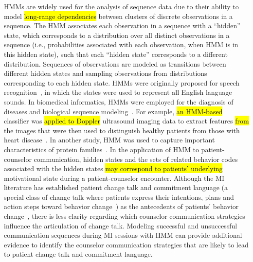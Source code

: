 \documentclass[smallextended]{svjour3}       %
\begin{document}
HMMs are widely used for the analysis of sequence data due to their ability to model \hl{long-range dependencies} between clusters of discrete observations in a sequence. The HMM associates each observation in a sequence with a ``hidden'' state, which corresponds to a distribution over all distinct observations in a sequence (i.e., probabilities associated with each observation, when HMM is in this hidden state), such that each ``hidden state'' corresponds to a different distribution. Sequences of observations are modeled as transitions between different hidden states and sampling observations from distributions corresponding to each hidden state. HMMs were originally proposed for speech recognition~\cite{rabiner1989tutorial}, in which the states were used to represent all English language sounds. In biomedical informatics, HMMs were employed for the diagnosis of diseases and biological sequence modeling~\cite{uuguz2007biomedical, amrhein2003client}. For example, \hl{an HMM-based} classifier was \hl{applied to Doppler} ultrasound imaging data to extract features \hl{from} the images that were then used to distinguish healthy patients from those with heart disease~\cite{uuguz2007biomedical}. In another study, HMM was used to capture important
characteristics of protein families~\cite{amrhein2003client}. In the application of HMM to patient-counselor communication, hidden states and the sets of related behavior codes associated with the hidden states \hl{may correspond to patients' underlying} motivational state during a patient-counselor encounter. Although the MI literature has established patient change talk and commitment language (a special class of change talk where patients express their intentions, plans and action steps toward behavior change~\cite{baldi1994hidden}) as the antecedents of patients' behavior change~\cite{apodaca2009mechanisms}, there is less clarity regarding which counselor communication strategies influence the articulation of change talk. Modeling successful and unsuccessful communication sequences during MI sessions with HMM can provide additional evidence to identify the counselor communication strategies that are likely to lead to patient change talk and commitment language. 
\end{document}
